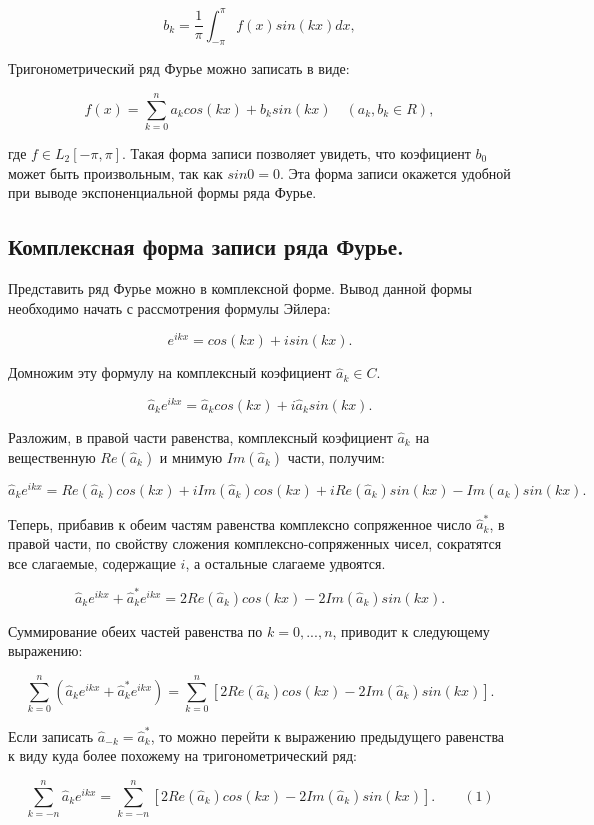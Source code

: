 \documentclass[12pt, a4paper]{article}
\begin{document}
	\[
	b_k = \frac{1}{\pi} \int_{-\pi}^{\pi} f(x) sin(kx) dx,
	\]
	
	Тригонометрический ряд Фурье можно записать в виде:
	
	\[
	f(x) = \sum_{k=0}^{n} a_k cos(kx) + b_k sin(kx) \quad (a_k, b_k \in R),
	\]
	
	где $f \in L_2\left[ -\pi, \pi \right]$. Такая форма записи позволяет увидеть, что коэфициент $b_0$ может быть произвольным, так как $sin0 = 0$. Эта форма записи окажется удобной при выводе экспоненциальной формы ряда Фурье.
	
	\subsection{Комплексная форма записи ряда Фурье.}
	
	Представить ряд Фурье можно в комплексной форме. Вывод данной формы необходимо начать с рассмотрения формулы Эйлера:
	
	\[
	e^{ikx} = cos(kx) + i sin(kx).
	\]
	
	Домножим эту формулу на комплексный коэфициент $\hat{a}_k \in C$.
	
	\[
	\hat{a}_k e^{ikx} = \hat{a}_k cos(kx) + i \hat{a}_k sin(kx).
	\]
	
	Разложим, в правой части равенства, комплексный коэфициент $\hat{a}_k$ на вещественную $Re(\hat{a}_k)$ и мнимую $Im(\hat{a}_k)$ части, получим:
	
	\[
	\hat{a}_k e^{ikx} = Re(\hat{a}_k) cos(kx) + i Im(\hat{a}_k) cos(kx) + i Re(\hat{a}_k) sin(kx) - Im(\hat{a}_k) sin(kx).
	\]
	
	Теперь, прибавив к обеим частям равенства комплексно сопряженное число $\hat{a}_k^*$, в правой части, по свойству сложения комплексно-сопряженных чисел, сократятся все слагаемые, содержащие  $i$, а остальные слагаеме удвоятся.
	
	\[
	\hat{a}_k e^{ikx} + \hat{a}_k^* e^{ikx} = 2Re(\hat{a}_k) cos(kx) - 2Im(\hat{a}_k) sin(kx).
	\]
	
	Суммирование обеих частей равенства по $k = 0, ..., n$, приводит к следующему выражению:
	
	\[
    \sum_{k=0}^{n}(\hat{a}_k e^{ikx} + \hat{a}_k^* e^{ikx}) = \sum_{k=0}^{n}[2Re(\hat{a}_k) cos(kx) - 2Im(\hat{a}_k) sin(kx)].
	\]
	 
	Если записать $\hat{a}_{-k} = \hat{a}_k^*$, то можно перейти к выражению предыдущего равенства к виду куда более похожему на тригонометрический ряд:
	
	\[
	\sum_{k=-n}^{n}\hat{a}_k e^{ikx} = \sum_{k=-n}^{n}[2Re(\hat{a}_k) cos(kx) - 2Im(\hat{a}_k) sin(kx)]. \qquad (1)
	\]
	
\end{document}
